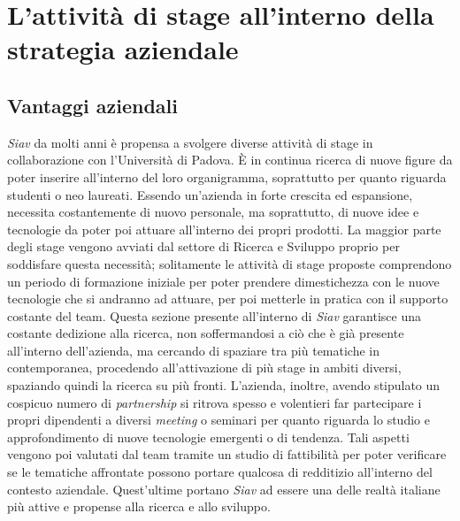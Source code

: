 
\chapter{L'attività di stage all'interno della strategia aziendale}
\label{cap:processi-metodologie}

\section{Vantaggi aziendali}
\textit{Siav} da molti anni è propensa a svolgere diverse attività di stage in collaborazione con l'Università di Padova. È in continua ricerca di nuove figure da poter inserire all'interno del loro organigramma, soprattutto per quanto riguarda studenti o neo laureati.  Essendo un'azienda in forte crescita ed espansione, necessita costantemente di nuovo personale, ma soprattutto, di nuove idee e tecnologie da poter poi attuare all'interno dei propri prodotti. La maggior parte degli stage vengono avviati dal settore di Ricerca e Sviluppo proprio per soddisfare questa necessità; solitamente le attività di stage proposte comprendono un periodo di formazione iniziale per poter prendere dimestichezza con le nuove tecnologie che si andranno ad attuare, per poi metterle in pratica con il supporto costante del team. Questa sezione presente all'interno di \textit{Siav} garantisce una costante dedizione alla ricerca, non soffermandosi a ciò che è già presente all'interno dell'azienda, ma cercando di spaziare tra più tematiche in contemporanea, procedendo all'attivazione di più stage in ambiti diversi, spaziando quindi la ricerca su più fronti. L'azienda, inoltre, avendo stipulato un cospicuo numero di \textit{partnership} si ritrova spesso e volentieri far partecipare i propri dipendenti a diversi \textit{meeting} o seminari per quanto riguarda lo studio e approfondimento di nuove tecnologie emergenti o di tendenza. Tali aspetti vengono poi valutati dal team tramite un studio di fattibilità per poter verificare se le tematiche affrontate possono portare qualcosa di redditizio all'interno del contesto aziendale. Quest'ultime portano \textit{Siav} ad essere una delle realtà italiane più attive e propense alla ricerca e allo sviluppo.
\newpage
